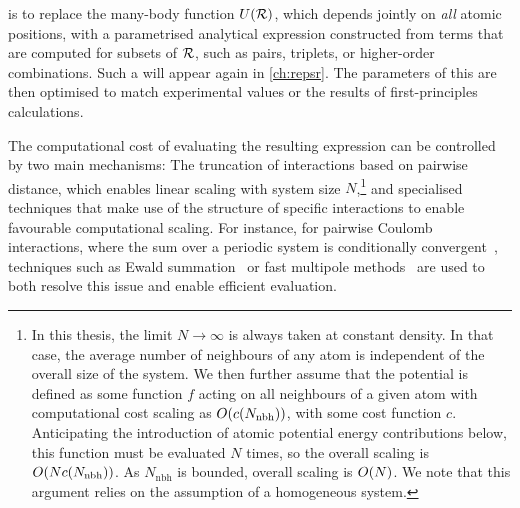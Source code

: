  is to replace the many-body function $U(\mathcal{R})$, which depends jointly on \emph{all} atomic positions, with a parametrised analytical expression constructed from terms that are computed for subsets of $\mathcal{R}$, such as pairs, triplets, or higher-order combinations. Such a  will appear again in \cref{ch:repsr}. The parameters of this \ff are then optimised to match experimental values or the results of first-principles calculations.

The computational cost of evaluating the resulting expression can be controlled by two main mechanisms: The truncation of interactions based on pairwise distance, which enables linear scaling with system size $N$,\footnote[][-10\baselineskip]{In this thesis, the limit $N\rightarrow\infty$ is always taken at constant density. In that case, the average number of neighbours of any atom is independent of the overall size of the system. We then further assume that the potential is defined as some function $f$ acting on all neighbours of a given atom with computational cost scaling as $O(c(N_{\text{nbh}}))$, with some cost function $c$. Anticipating the introduction of atomic potential energy contributions below, this function must be evaluated $N$ times, so the overall scaling is $O(N c(N_{\text{nbh}}))$. As $N_{\text{nbh}}$ is bounded, overall scaling is $O(N)$. We note that this argument relies on the assumption of a homogeneous system.} and specialised techniques that make use of the structure of specific interactions to enable favourable computational scaling. For instance, for pairwise Coulomb interactions, where the sum over a periodic system is conditionally convergent~\cite{b2014p}, techniques such as Ewald summation~\cite{e1921p,dyp1993p} or fast multipole methods~\cite{gr1987p,wh1994p} are used to both resolve this issue and enable efficient evaluation.

